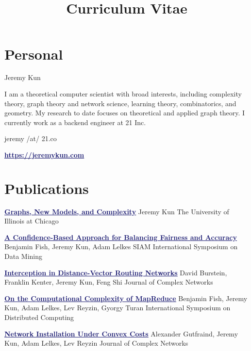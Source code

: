 \documentclass[11pt]{moderncv}
\title{Curriculum Vitae}
\begin{document}
   \maketitle

      \section{Personal}
         {Jeremy Kun}

         {I am a theoretical computer scientist with broad interests, including complexity theory, graph theory and network science, learning theory, combinatorics, and geometry. My research to date focuses on theoretical and applied graph theory. I currently work as a backend engineer at 21 Inc.}

         {jeremy /at/ 21.co}

         {\href{https://jeremykun.com}{\textcolor{MidnightBlue}{\underline{\textbf{https://jeremykun.com}}}}}


   \section{Publications}
         {\href{http://www.levreyzin.com/papers/Kun16_phd.pdf}{\textcolor{MidnightBlue}{\underline{\textbf{Graphs, New Models, and Complexity}}}}}
      {Jeremy Kun}
      {The University of Illinois at Chicago}
      {}
      {}

         {\href{}{\textcolor{MidnightBlue}{\underline{\textbf{A Confidence-Based Approach for Balancing Fairness and Accuracy}}}}}
      {Benjamin Fish, Jeremy Kun, Adam Lelkes}
      {SIAM International Symposium on Data Mining}
      {}
      {}

         {\href{http://arxiv.org/abs/1507.05206}{\textcolor{MidnightBlue}{\underline{\textbf{Interception in Distance-Vector Routing Networks}}}}}
      {David Burstein, Franklin Kenter, Jeremy Kun, Feng Shi}
      {Journal of Complex Networks}
      {}
      {}

         {\href{http://arxiv.org/abs/1410.0245}{\textcolor{MidnightBlue}{\underline{\textbf{On the Computational Complexity of MapReduce}}}}}
      {Benjamin Fish, Jeremy Kun, Adam Lelkes, Lev Reyzin, Gyorgy Turan}
      {International Symposium on Distributed Computing}
      {}
      {}

         {\href{http://comnet.oxfordjournals.org/cgi/content/abstract/cnv020?ijkey=ZiDO26VV0vKrRIO&keytype=ref}{\textcolor{MidnightBlue}{\underline{\textbf{Network Installation Under Convex Costs}}}}}
      {Alexander Gutfraind, Jeremy Kun, Adam Lelkes, Lev Reyzin}
      {Journal of Complex Networks}
      {}
      {}
\end{document}
